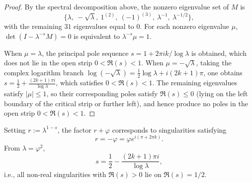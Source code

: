 \begin{proof}
By the spectral decomposition above, the nonzero eigenvalue set of $M$ is
\[
\{\lambda,\ -\sqrt{\lambda},\ 1^{(2)},\ (-1)^{(3)},\ \lambda^{-1},\ \lambda^{-1/2}\},
\]
with the remaining $31$ eigenvalues equal to $0$. For each nonzero eigenvalue $\mu$, $\det(I-\lambda^{-s}M)=0$ is equivalent to $\lambda^{-s}\mu=1$.

When $\mu=\lambda$, the principal pole sequence $s=1+2\pi i k/\log\lambda$ is obtained, which does not lie in the open strip $0<\Re(s)<1$.
When $\mu=-\sqrt{\lambda}$, taking the complex logarithm branch $\log(-\sqrt{\lambda})=\tfrac12\log\lambda+i(2k+1)\pi$, one obtains
\(
s=\tfrac12+\frac{(2k+1)\pi i}{\log\lambda}
\), which satisfies $0<\Re(s)<1$.
The remaining eigenvalues satisfy $|\mu|\le 1$, so their corresponding poles satisfy $\Re(s)\le 0$ (lying on the left boundary of the critical strip or further left), and hence produce no poles in the open strip $0<\Re(s)<1$.
\end{proof}

\begin{remark}
Setting $r:=\lambda^{1-s}$, the factor $r+\varphi$ corresponds to singularities satisfying
\[
r=-\varphi=\varphi e^{i(\pi+2\pi k)}.
\]
From $\lambda=\varphi^2$,
\[
s=\frac12-\frac{(2k+1)\pi i}{\log\lambda},
\]
i.e., all non-real singularities with $\Re(s)>0$ lie on $\Re(s)=1/2$.
\end{remark}

